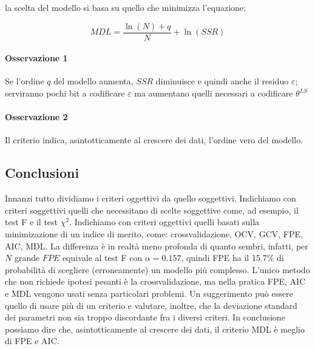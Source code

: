 la scelta del modello si basa su quello che minimizza l'equazione:

    \[ MDL=\frac{\ln(N)+q}{N}+\ln(SSR) \]

\paragraph{Osservazione 1} Se l'ordine $q$ del modello aumenta, $SSR$ diminuisce e quindi anche il residuo $\varepsilon$; serviranno pochi bit a codificare $\varepsilon$ ma aumentano quelli necessari a codificare $\theta^{LS}$
\paragraph{Osservazione 2} Il criterio indica, asintotticamente al crescere dei dati, l'ordine vero del modello.
\subsection{Conclusioni}
Innanzi tutto dividiamo i criteri oggettivi da quello soggettivi. Indichiamo con criteri soggettivi quelli che necessitano di scelte soggettive come, ad esempio, il test F e il test $\chi^2$. Indichiamo con criteri oggettivi quelli basati sulla minimizazione di un indice di merito, come: crossvalidazione, OCV, GCV, FPE, AIC, MDL. La differenza è in realtà meno profonda di quanto sembri, infatti, per $N$ grande $FPE$ equivale al test F con $\alpha=0.157$, quindi FPE ha il 15.7\% di probabilità di scegliere (erroneamente) un modello più complesso.
L'unico metodo che non richiede ipotesi pesanti è la crossvalidazione, ma nella pratica FPE, AIC e MDL vengono usati senza particolari problemi.
Un suggerimento può essere quello di usare più di un criterio e valutare, inoltre, che la deviazione standard dei parametri non sia troppo discordante fra i diversi criteri.
In conclusione possiamo dire che, asintotticamente al crescere dei dati, il criterio MDL è meglio di FPE e AIC.
